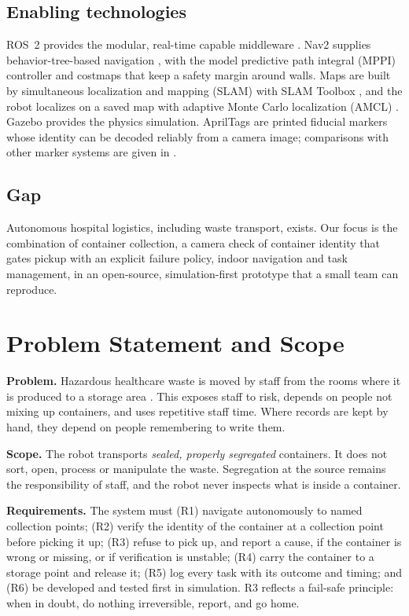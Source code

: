 \documentclass[conference]{IEEEtran}
\begin{document}
\subsection{Enabling technologies}
ROS~2 provides the modular, real-time capable middleware \cite{macenski2022ros2}. Nav2 supplies behavior-tree-based navigation \cite{macenski2020marathon2,macenski2023desks}, with the model predictive path integral (MPPI) controller \cite{williams2017mppi} and costmaps that keep a safety margin around walls. Maps are built by simultaneous localization and mapping (SLAM) with SLAM Toolbox \cite{macenski2021slamtoolbox}, and the robot localizes on a saved map with adaptive Monte Carlo localization (AMCL) \cite{dellaert1999mcl,fox2003kld}. Gazebo \cite{koenig2004gazebo} provides the physics simulation. AprilTags \cite{olson2011apriltag,wang2016apriltag2} are printed fiducial markers whose identity can be decoded reliably from a camera image; comparisons with other marker systems are given in \cite{kalaitzakis2021fiducial}.

\subsection{Gap}
Autonomous hospital logistics, including waste transport, exists. Our focus is the combination of container collection, a camera check of container identity that gates pickup with an explicit failure policy, indoor navigation and task management, in an open-source, simulation-first prototype that a small team can reproduce.

\section{Problem Statement and Scope}\label{sec:problem}
\textbf{Problem.} Hazardous healthcare waste is moved by staff from the rooms where it is produced to a storage area \cite{who_safe}. This exposes staff to risk, depends on people not mixing up containers, and uses repetitive staff time. Where records are kept by hand, they depend on people remembering to write them.

\textbf{Scope.} The robot transports \emph{sealed, properly segregated} containers. It does not sort, open, process or manipulate the waste. Segregation at the source remains the responsibility of staff, and the robot never inspects what is inside a container.

\textbf{Requirements.} The system must (R1) navigate autonomously to named collection points; (R2) verify the identity of the container at a collection point before picking it up; (R3) refuse to pick up, and report a cause, if the container is wrong or missing, or if verification is unstable; (R4) carry the container to a storage point and release it; (R5) log every task with its outcome and timing; and (R6) be developed and tested first in simulation. R3 reflects a fail-safe principle: when in doubt, do nothing irreversible, report, and go home.
\end{document}
